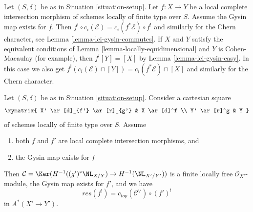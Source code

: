 \begin{remark}
\label{remark-gysin-chern-classes}
Let $(S, \delta)$ be as in Situation \ref{situation-setup}.
Let $f : X \to Y$ be a local complete intersection morphism
of schemes locally of finite type over $S$. Assume the Gysin
map exists for $f$. Then
$f^! \circ c_i(\mathcal{E}) = c_i(f^*\mathcal{E}) \circ f^!$
and similarly for the Chern character, see
Lemma \ref{lemma-lci-gysin-commutes}.
If $X$ and $Y$ satisfy the equivalent conditions of
Lemma \ref{lemma-locally-equidimensional} and $Y$ is Cohen-Macaulay
(for example), then $f^![Y] = [X]$ by Lemma \ref{lemma-lci-gysin-easy}.
In this case we also get
$f^!(c_i(\mathcal{E}) \cap [Y]) = c_i(f^*\mathcal{E}) \cap [X]$
and similarly for the Chern character.
\end{remark}

\begin{lemma}
\label{lemma-compare-gysin-base-change}
Let $(S, \delta)$ be as in Situation \ref{situation-setup}.
Consider a cartesian square
$$
\xymatrix{
X' \ar[d]_{f'} \ar[r]_{g'} &
X \ar[d]^f \\
Y' \ar[r]^g &
Y
}
$$
of schemes locally of finite type over $S$. Assume
\begin{enumerate}
\item both $f$ and $f'$ are local complete intersection morphisms, and
\item the Gysin map exists for $f$
\end{enumerate}
Then $\mathcal{C} = \Ker(H^{-1}((g')^*\NL_{X/Y}) \to H^{-1}(\NL_{X'/Y'}))$
is a finite locally free $\mathcal{O}_{X'}$-module, the Gysin map
exists for $f'$, and we have
$$
res(f^!) = c_{top}(\mathcal{C}^\vee) \circ (f')^!
$$
in $A^*(X' \to Y')$.
\end{lemma}

